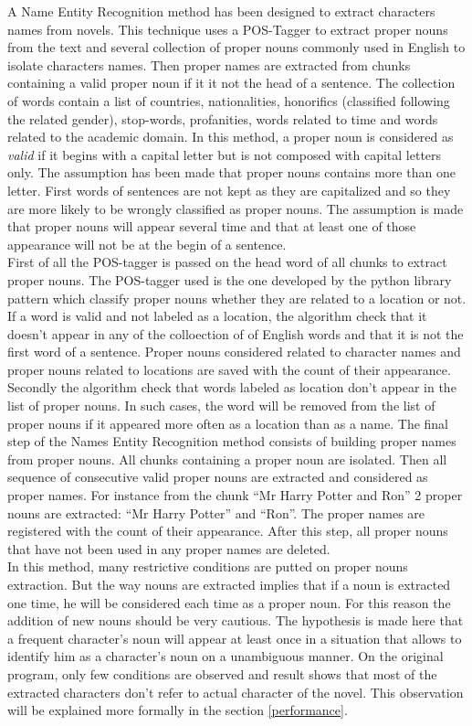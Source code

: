 \documentclass[a4paper, 12pt]{report}
\begin{document}
A Name Entity Recognition method has been designed to extract characters names from novels. 
This technique uses a POS-Tagger to extract proper nouns from the text and several collection of proper nouns commonly used in English to isolate characters names. 
Then proper names are extracted from chunks containing a valid proper noun if it it not the head of a sentence. 
The collection of words contain a list of countries, nationalities, honorifics (classified following the related gender), stop-words, profanities, 
words related to time and words related to the academic domain. 
In this method, a  proper noun is considered as \textit{valid} if it begins with a capital letter but is not composed with capital letters only. 
The assumption has been made that proper nouns contains more than one letter.  
First words of sentences are not kept as they are capitalized and so they are more likely to be wrongly classified as proper nouns. 
The assumption is made that proper nouns will appear several time and that at least one of those appearance will not be at the begin of a sentence.\\

First of all the POS-tagger is passed on the head word of all chunks to extract  proper nouns. 
The POS-tagger used is the one developed by the python library pattern which classify  proper nouns whether they are related to a location or not. 
If a word is valid and not labeled as a location, the algorithm check that it doesn't appear in any of the colloection of of English words and that 
it is not the first word of a sentence. Proper nouns considered related to character names and  proper nouns related to locations are saved with the count of their appearance.
Secondly the algorithm check that words labeled as location don't appear in the list of proper nouns. 
In such cases, the word will be removed from the list of proper nouns if it appeared more often as a location than as a name.
The final step of the Names Entity Recognition method consists of building proper names from proper nouns. 
All chunks containing a proper noun are isolated. 
Then all sequence of consecutive valid  proper nouns are extracted and considered as proper names. 
For instance from the chunk ``Mr Harry Potter and Ron'' 2 proper nouns are extracted: ``Mr Harry Potter'' and ``Ron''. 
The proper names are registered with the count of their appearance. After this step, all proper nouns that have not been used in any proper names are deleted.\\

In this method, many restrictive conditions are putted on proper nouns extraction. 
But the way nouns are extracted implies that if a noun is extracted one time, he will be considered each time as a proper noun. 
For this reason the addition of new nouns should be very cautious. 
The hypothesis is made here that a frequent character's noun will appear at least once in a situation that allows to identify him as a character's noun on a unambiguous manner. 
On the original program, only few conditions are observed and result shows that most of the extracted characters don't refer to actual character of the novel. 
This observation will be explained more formally in the section \ref{performance}.
\end{document}
